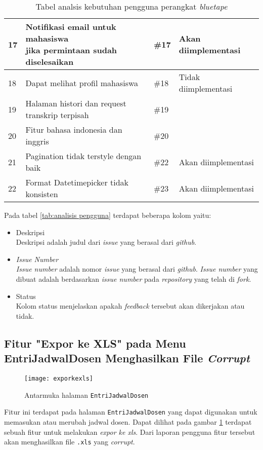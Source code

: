 \begin{table}[H]
{\begin{tabular}{|l|l|l|l|}
	17 & \makecell[l]{Notifikasi email untuk mahasiswa \\ jika permintaan sudah diselesaikan} & \#17 & Akan diimplementasi\\ \hline
	18 & Dapat melihat profil mahasiswa & \#18 & Tidak diimplementasi\\ \hline
	19 & Halaman histori dan request transkrip terpisah & \#19 & \\ \hline
	20 & Fitur bahasa indonesia dan inggris & \#20 & \\ \hline
	21 & Pagination tidak terstyle dengan baik & \#22 & Akan diimplementasi\\ \hline
	22 & Format Datetimepicker tidak konsisten &\#23 & Akan diimplementasi\\ \hline
	
	
	\end{tabular}}
	\caption{Tabel analsis kebutuhan pengguna perangkat \textit{bluetape}}
\end{table}

Pada tabel \ref{tab:analisis pengguna} terdapat beberapa kolom yaitu:
\begin{itemize}
	\item Deskripsi \\
	Deskripsi adalah judul dari \textit{issue} yang berasal dari \textit{github}.
	\item \textit{Issue Number} \\ \textit{Issue number} adalah nomor \textit{issue} yang berasal dari \textit{github}. \textit{Issue number} yang dibuat adalah berdasarkan \textit{issue number} pada \textit{repository} yang telah di \textit{fork}.
	\item Status \\
	Kolom status menjelaskan apakah \textit{feedback} tersebut akan dikerjakan atau tidak.
\end{itemize}

\subsection{Fitur "Expor ke XLS" pada Menu EntriJadwalDosen Menghasilkan File  \textit{Corrupt}}
\begin{figure}[H]
	\centering
	\texttt{[image: exporkexls]} 
	\caption{Antarmuka halaman \texttt{EntriJadwalDosen}}
	\label{fig:EntriJadwalDosen} 
\end{figure}

Fitur ini terdapat pada halaman \texttt{EntriJadwalDosen} yang dapat digunakan untuk memasukan atau merubah jadwal dosen. Dapat dilihat pada gambar \ref{fig:EntriJadwalDosen} terdapat sebuah fitur untuk melakukan \textit{expor ke xls}. Dari laporan pengguna fitur tersebut akan menghasilkan file \texttt{.xls} yang \textit{corrupt}. 

